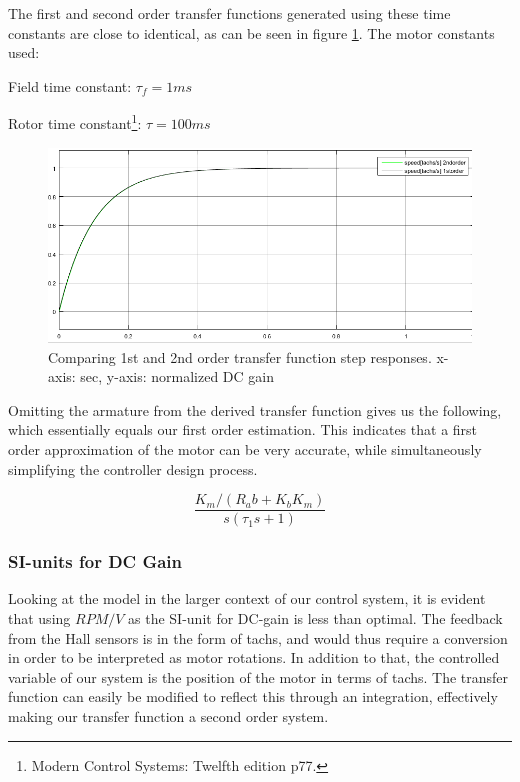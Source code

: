 The first and second order transfer functions generated using these time constants are close to identical, as can be seen in figure \ref{fig:1st2ndorderstep}. The motor constants used:

Field time constant: $\tau_f = 1ms$ 

Rotor time constant\footnote{Modern Control Systems: Twelfth edition p77.}: $\tau = 100ms$ 

\begin{figure}[h!]
\centering
\includegraphics[scale=0.6]{Billeder/1st2ndorderstep.png}
\caption{Comparing 1st and 2nd order transfer function step responses. x-axis: sec, y-axis: normalized DC gain}
\label{fig:1st2ndorderstep}
\end{figure}

Omitting the armature from the derived transfer function gives us the following, which essentially equals our first order estimation. This indicates that a first order approximation of the motor can be very accurate, while simultaneously simplifying the controller design process.

\begin{equation}
\frac{K_m /(R_a b+K_b K_m )}{s(\tau_1 s +1)}
\end{equation}

\subsubsection{SI-units for DC Gain}
Looking at the model in the larger context of our control system, it is evident that using $RPM/V$ as the SI-unit for DC-gain is less than optimal. The feedback from the Hall sensors is in the form of tachs, and would thus require a conversion in order to be interpreted as motor rotations. In addition to that, the controlled variable of our system is the position of the motor in terms of tachs. The transfer function can easily be modified to reflect this through an integration, effectively making our transfer function a second order system.

